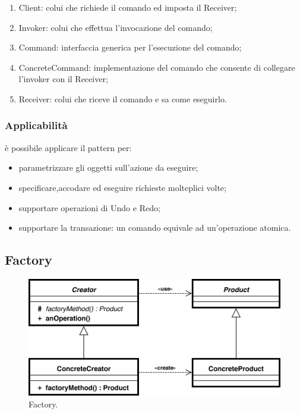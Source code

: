 \begin{enumerate}
	\item Client: colui che richiede il comando  ed imposta il Receiver;
	\item Invoker: colui che effettua l'invocazione del comando;
	\item Command: interfaccia generica per l'esecuzione del comando;
	\item ConcreteCommand: implementazione del comando che consente di collegare l'invoker con il Receiver;
	\item Receiver: colui che riceve il comando e sa come eseguirlo.
\end{enumerate}

\subsubsection{Applicabilità} è possibile applicare il pattern per:

\begin{itemize}
	\item parametrizzare gli oggetti sull'azione da eseguire;
	\item specificare,accodare ed eseguire richieste molteplici volte;
	\item supportare operazioni di Undo e Redo;
	\item supportare la transazione: un comando equivale ad un'operazione atomica.
\end{itemize}

\subsection{Factory}

\begin{figure} \label{fig:factory}
	\includegraphics[scale=0.5]{img/factory.png}
	\caption{Factory.}
\end{figure}

